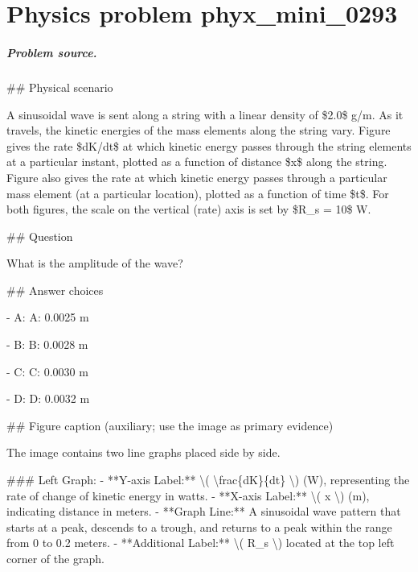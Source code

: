 
\chapter{Physics problem phyx\_mini\_0293}
\label{ch:PhyXMiniProblems_problem_phyx_mini_0293}

\paragraph{Problem source.}
\#\# Physical scenario

A sinusoidal wave is sent along a string with a linear density of \$2.0\$ g/m. As it travels, the kinetic energies of the mass elements along the string vary. Figure gives the rate \$dK/dt\$ at which kinetic energy passes through the string elements at a particular instant, plotted as a function of distance \$x\$ along the string. Figure also gives the rate at which kinetic energy passes through a particular mass element (at a particular location), plotted as a function of time \$t\$. For both figures, the scale on the vertical (rate) axis is set by \$R\_s = 10\$ W.

\#\# Question

What is the amplitude of the wave?

\#\# Answer choices

- A: A: 0.0025 m

- B: B: 0.0028 m

- C: C: 0.0030 m

- D: D: 0.0032 m

\#\# Figure caption (auxiliary; use the image as primary evidence)

The image contains two line graphs placed side by side.

\#\#\# Left Graph:
- **Y-axis Label:** \textbackslash{}( \textbackslash{}frac\{dK\}\{dt\} \textbackslash{}) (W), representing the rate of change of kinetic energy in watts.
- **X-axis Label:** \textbackslash{}( x \textbackslash{}) (m), indicating distance in meters.
- **Graph Line:** A sinusoidal wave pattern that starts at a peak, descends to a trough, and returns to a peak within the range from 0 to 0.2 meters.
- **Additional Label:** \textbackslash{}( R\_s \textbackslash{}) located at the top left corner of the graph.

